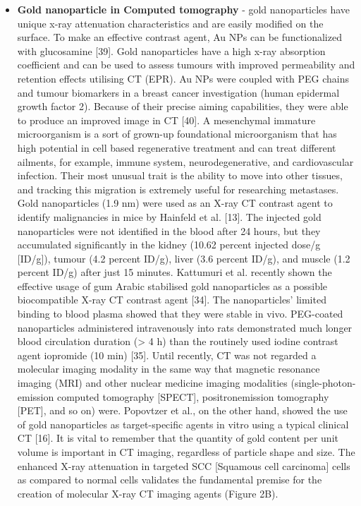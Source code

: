 \documentclass[12pt]{article}
\begin{document}
\begin{itemize}
    \item \textbf{ Gold nanoparticle in Computed tomography} - gold nanoparticles have unique x-ray attenuation characteristics and are easily modified on the surface. To make an effective contrast agent, Au NPs can be functionalized with glucosamine [39]. Gold nanoparticles have a high x-ray absorption coefficient and can be used to assess tumours with improved permeability and retention effects utilising CT (EPR). Au NPs were coupled with PEG chains and tumour biomarkers in a breast cancer investigation (human epidermal growth factor 2). Because of their precise aiming capabilities, they were able to produce an improved image in CT [40]. A mesenchymal immature microorganism is a
sort of grown-up foundational microorganism that has high potential in cell based regenerative treatment and can treat different ailments, for example, immune system, neurodegenerative, and cardiovascular infection. Their most unusual trait is the ability to move into other tissues, and tracking this migration is extremely useful for researching metastases. Gold nanoparticles (1.9 nm) were used as an X-ray CT contrast agent to identify malignancies in mice by Hainfeld et al. [13].
The injected gold nanoparticles were not identified in the blood after 24 hours, but they accumulated significantly in the kidney (10.62 percent injected dose/g [ID/g]), tumour (4.2 percent ID/g), liver (3.6 percent ID/g), and muscle (1.2 percent ID/g) after just 15 minutes. Kattumuri et al. recently shown the effective usage of gum Arabic stabilised gold nanoparticles as a possible biocompatible X-ray CT contrast agent [34]. The nanoparticles' limited binding to blood plasma showed that they were stable in vivo. PEG-coated nanoparticles administered intravenously into rats demonstrated much longer blood circulation duration (> 4 h) than the routinely used iodine contrast agent iopromide (10 min) [35]. Until recently, CT was not regarded a molecular imaging modality in the same way that magnetic resonance imaging (MRI) and other nuclear medicine imaging modalities (single-photon-emission computed tomography [SPECT], positronemission tomography [PET], and so on) were.
Popovtzer et al., on the other hand, showed the use of gold nanoparticles as target-specific agents in vitro using a typical clinical CT [16]. It is vital to remember that the quantity of gold content per unit volume is important in CT imaging, regardless of particle shape and size. The enhanced X-ray attenuation in targeted SCC [Squamous cell carcinoma] cells as compared to normal cells validates the fundamental premise for the creation of molecular X-ray CT imaging agents (Figure 2B).

\end{itemize}
\end{document}
